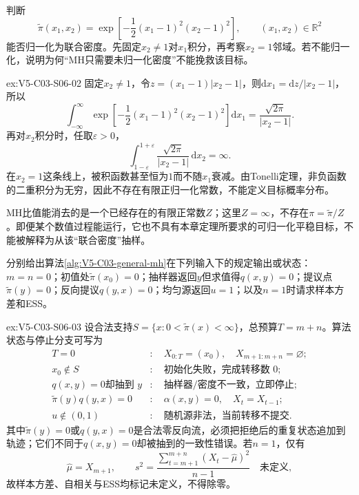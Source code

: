 \begin{SLChapterExercisePairSection}
\begin{exercise}\label{ex:V5-C03-S06-02}
判断
\[
\widetilde\pi(x_1,x_2)
=\exp\!\left[-\frac12(x_1-1)^2(x_2-1)^2\right],
\qquad (x_1,x_2)\in\mathbb R^2
\]
能否归一化为联合密度。先固定$x_2\ne1$对$x_1$积分，再考察$x_2=1$邻域。若不能归一化，说明为何“MH只需要未归一化密度”不能挽救该目标。
\end{exercise}
\ifSLFullEdition
{}\label{sol:V5-C03-S06-02}
\begin{chapterexercisesolution}{ex:V5-C03-S06-02}
固定$x_2\ne1$，令$z=(x_1-1)|x_2-1|$，则$\mathrm dx_1=\mathrm dz/|x_2-1|$，所以
\[
\int_{-\infty}^{\infty}
\exp\!\left[-\frac12(x_1-1)^2(x_2-1)^2\right]\mathrm dx_1
=\frac{\sqrt{2\pi}}{|x_2-1|}.
\]
再对$x_2$积分时，任取$\varepsilon>0$，
\[
\int_{1-\varepsilon}^{1+\varepsilon}
\frac{\sqrt{2\pi}}{|x_2-1|}\,\mathrm dx_2
=\infty.
\]
在$x_2=1$这条线上，被积函数甚至恒为$1$而不随$x_1$衰减。由Tonelli定理，非负函数的二重积分为无穷，因此不存在有限正归一化常数，不能定义目标概率分布。

MH比值能消去的是一个已经存在的有限正常数$Z$；这里$Z=\infty$，不存在$\pi=\widetilde\pi/Z$。即便某个数值过程能运行，它也不具有本章定理所要求的可归一化平稳目标，不能被解释为从该“联合密度”抽样。
\end{chapterexercisesolution}
\fi

\begin{exercise}\label{ex:V5-C03-S06-03}
分别给出算法\ref{alg:V5-C03-general-mh}在下列输入下的规定输出或状态：$m=n=0$；初值处$\widetilde\pi(x_0)=0$；抽样器返回$y$但求值得$q(x,y)=0$；提议点$\widetilde\pi(y)=0$；反向提议$q(y,x)=0$；均匀源返回$u=1$；以及$n=1$时请求样本方差和ESS。
\end{exercise}
\ifSLFullEdition
{}\label{sol:V5-C03-S06-03}
\begin{chapterexercisesolution}{ex:V5-C03-S06-03}
设合法支持$S=\{x:0<\widetilde\pi(x)<\infty\}$，总预算$T=m+n$。算法状态与停止分支可写为
\[
\begin{aligned}
T=0&:\quad X_{0:T}=(x_0),\quad X_{m+1:m+n}=\varnothing;\\
x_0\notin S&:\quad \text{初始化失败，完成转移数 }0;\\
q(x,y)=0\text{却抽到 }y&:\quad \text{抽样器/密度不一致，立即停止};\\
\widetilde\pi(y)q(y,x)=0&:\quad \alpha(x,y)=0,
\quad X_t=X_{t-1};\\
u\notin(0,1)&:\quad \text{随机源非法，当前转移不提交}.
\end{aligned}
\]
其中$\widetilde\pi(y)=0$或$q(y,x)=0$是合法零反向流，必须把拒绝后的重复状态追加到轨迹；它们不同于$q(x,y)=0$却被抽到的一致性错误。若$n=1$，仅有
\[
\widehat\mu=X_{m+1},\qquad
s^2=\frac{\sum_{t=m+1}^{m+n}(X_t-\widehat\mu)^2}{n-1}
\quad\text{未定义},
\]
故样本方差、自相关与ESS均标记未定义，不得除零。
\end{chapterexercisesolution}
\fi


\end{SLChapterExercisePairSection}
